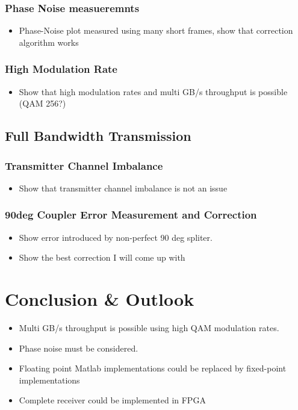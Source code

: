 \subsection{Phase Noise measueremnts}
\begin{itemize}
\item Phase-Noise plot measured using many short frames, show that correction algorithm works
\end{itemize}

\subsection{High Modulation Rate}
\begin{itemize}
\item Show that high modulation rates and multi GB/s throughput is possible (QAM 256?)
\end{itemize}

\section{Full Bandwidth Transmission}
\subsection{Transmitter Channel Imbalance}
\begin{itemize}
\item Show that transmitter channel imbalance is not an issue
\end{itemize}

\subsection{90deg Coupler Error Measurement and Correction}
\begin{itemize}
\item Show error introduced by non-perfect 90 deg spliter.
\item Show the best correction I will come up with
\end{itemize}

\chapter{Conclusion \& Outlook}
\begin{itemize}
\item Multi GB/s throughput is possible using high QAM modulation rates.
\item Phase noise must be considered.
\item Floating point Matlab implementations could be replaced by fixed-point implementations
\item Complete receiver could be implemented in FPGA
\end{itemize}
